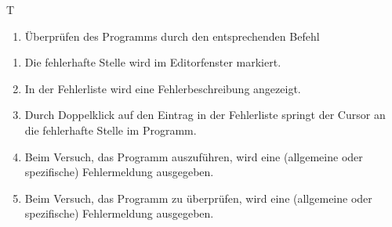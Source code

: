 \begin{reqlist}{T}
{{\begin{enumerate}
				\item Überprüfen des Programms durch den entsprechenden Befehl
			\end{enumerate}
		}
		{
			\begin{enumerate}
				\item Die fehlerhafte Stelle wird im Editorfenster markiert.
				\item In der Fehlerliste wird eine Fehlerbeschreibung angezeigt.
				\item Durch Doppelklick auf den Eintrag in der Fehlerliste springt der Cursor an die fehlerhafte Stelle im Programm.
				\item Beim Versuch, das Programm auszuführen, wird eine (allgemeine oder spezifische) Fehlermeldung ausgegeben.
				\item Beim Versuch, das Programm zu überprüfen, wird eine (allgemeine oder spezifische) Fehlermeldung ausgegeben.
			\end{enumerate}	
		}
	}
	
	

\end{reqlist}
